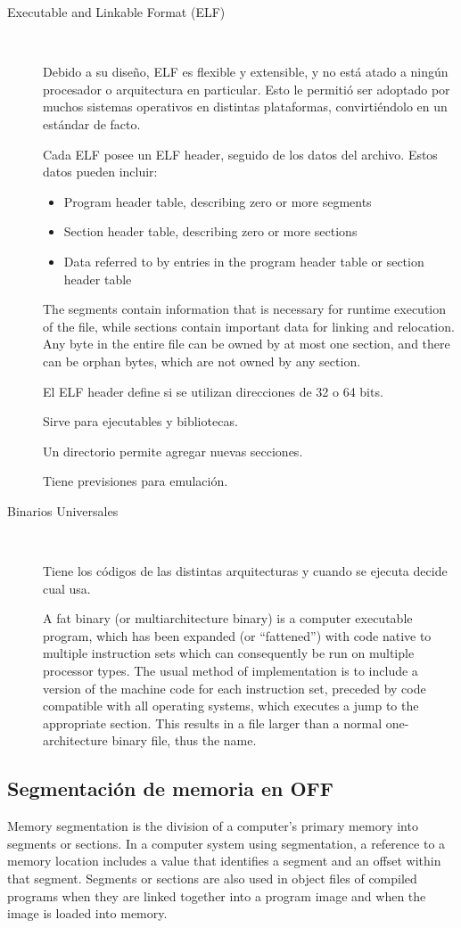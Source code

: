 \documentclass[a4paper, twoside]{article}
\begin{document}
\begin{description}
	\item[Executable and Linkable Format (ELF)] ~
	
	Debido a su diseño, ELF es flexible y extensible, y no está atado a ningún procesador o arquitectura en particular. Esto le permitió ser adoptado por muchos sistemas operativos en distintas plataformas, convirtiéndolo en un estándar de facto.

	Cada ELF posee un ELF header, seguido de los datos del archivo. Estos datos pueden incluir:
	\begin{itemize}
		\item Program header table, describing zero or more segments
		\item Section header table, describing zero or more sections
		\item Data referred to by entries in the program header table or section header table
	\end{itemize}

	The segments contain information that is necessary for runtime execution of the file, while sections contain important data for linking and relocation. Any byte in the entire file can be owned by at most one section, and there can be orphan bytes, which are not owned by any section.

	El ELF header define si se utilizan direcciones de 32 o 64 bits.

	Sirve para ejecutables y bibliotecas.

	Un directorio permite agregar nuevas secciones.

	Tiene previsiones para emulación.

	\item[Binarios Universales] ~

	Tiene los códigos de las distintas arquitecturas y cuando se ejecuta decide cual usa.

	A fat binary (or multiarchitecture binary) is a computer executable program, which has been expanded (or ``fattened'') with code native to multiple instruction sets which can consequently be run on multiple processor types. The usual method of implementation is to include a version of the machine code for each instruction set, preceded by code compatible with all operating systems, which executes a jump to the appropriate section. This results in a file larger than a normal one-architecture binary file, thus the name.
\end{description}

\subsection{Segmentación de memoria en OFF}
Memory segmentation is the division of a computer's primary memory into segments or sections. In a computer system using segmentation, a reference to a memory location includes a value that identifies a segment and an offset within that segment. Segments or sections are also used in object files of compiled programs when they are linked together into a program image and when the image is loaded into memory.
\end{document}
